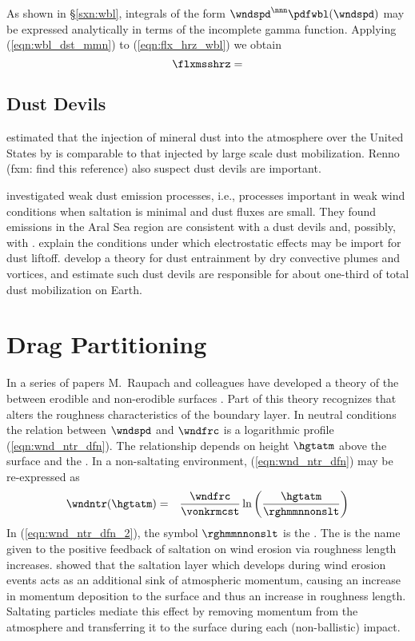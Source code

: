 \documentclass[12pt,twoside]{book}
\begin{document}
As shown in \S\ref{sxn:wbl}, integrals of the form 
$\wndspd^{\nnn} \pdfwbl(\wndspd)$ may be expressed analytically in
terms of the incomplete gamma function. 
Applying (\ref{eqn:wbl_dst_mmn}) to (\ref{eqn:flx_hrz_wbl}) we obtain
\begin{equation}
\flxmsshrz = 
\label{eqn:flx_hrz_gmm}
\end{equation}

\subsection[Dust Devils]{Dust Devils}\label{sxn:dst_dvl}
\cite{GiS90} estimated that the injection of mineral dust into the
atmosphere over the United States by  is
comparable to that injected by large scale dust mobilization.
Renno (fxm: find this reference) also suspect dust devils are
important.

\cite{GGA03} investigated weak dust emission processes, i.e.,
processes important in weak wind conditions when saltation is minimal
and dust fluxes are small.
They found emissions in the Aral Sea region are consistent with a 
dust devils and, possibly, with .
\cite{YaA97} explain the conditions under which electrostatic effects
may be import for dust liftoff.
\cite{KoR05} develop a theory for dust entrainment by dry convective
plumes and vortices, and estimate such dust devils are responsible for
about one-third of total dust mobilization on Earth.

\section{Drag Partitioning}\label{sxn:drg}
In a series of papers M.~Raupach and colleagues have developed a 
theory of the  between erodible and
non-erodible surfaces \cite[][]{Rau91,Rau92,RGL93,Rau94}.
Part of this theory recognizes that  alters
the roughness characteristics of the boundary layer.
In neutral conditions the relation between 
$\wndspd$ and  $\wndfrc$ is a logarithmic 
profile (\ref{eqn:wnd_ntr_dfn}). 
The relationship depends on height $\hgtatm$ above the surface
and the .
In a non-saltating environment, (\ref{eqn:wnd_ntr_dfn}) may be
re-expressed as 
\begin{eqnarray}
\wndntr ( \hgtatm ) & = & 
\frac{\wndfrc}{\vonkrmcst} \ln \left( \frac{\hgtatm}{\rghmmnnonslt} \right)
\label{eqn:wnd_ntr_dfn_2}
\end{eqnarray}
In (\ref{eqn:wnd_ntr_dfn_2}), the symbol $\rghmmnnonslt$ is
the .
The  is the name given to the positive feedback of
saltation on wind erosion via roughness length increases.
\cite{Owe64} showed that the saltation layer which develops during
wind erosion events acts as an additional sink of atmospheric
momentum, causing an increase in momentum deposition to the surface
and thus an increase in roughness length.
Saltating particles mediate this effect by removing momentum from the
atmosphere and transferring it to the surface during each
(non-ballistic) impact. 
\end{document}
